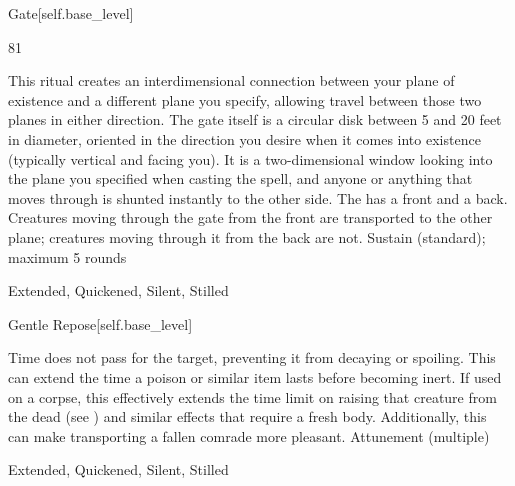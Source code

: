 \begin{spellsection}{Gate}[self.base_level]
\begin{spellcontent}
\begin{spelltargetinginfo}
\spellrng{\rngclose}
 81
\end{spelltargetinginfo}
\begin{spelleffects}
\spelleffect
This ritual creates an interdimensional connection between your plane of existence and a different plane you specify, allowing travel between those two planes in either direction.
The gate itself is a circular disk between 5 and 20 feet in diameter, oriented in the direction you desire when it comes into existence (typically vertical and facing you).
It is a two-dimensional window looking into the plane you specified when casting the spell, and anyone or anything that moves through is shunted instantly to the other side.
The  has a front and a back. Creatures moving through the gate from the front are transported to the other plane; creatures moving through it from the back are not.
\spelldur Sustain (standard); maximum 5 rounds
\end{spelleffects}
\end{spellcontent}
\begin{spellfooter}
 Extended, Quickened, Silent, Stilled
\end{spellfooter}
\begin{spellsubcontent}
\end{spellsubcontent}
\end{spellsection}
\begin{spellsection}{Gentle Repose}[self.base_level]
\begin{spellcontent}
\begin{spelltargetinginfo}
\end{spelltargetinginfo}
\begin{spelleffects}
\spelleffect
Time does not pass for the target, preventing it from decaying or spoiling.
This can extend the time a poison or similar item lasts before becoming inert.
If used on a corpse, this effectively extends the time limit on raising that creature from the dead (see ) and similar effects that require a fresh body.
Additionally, this can make transporting a fallen comrade more pleasant.
\spelldur Attunement (multiple)
\end{spelleffects}
\end{spellcontent}
\begin{spellfooter}
 Extended, Quickened, Silent, Stilled
\end{spellfooter}
\begin{spellsubcontent}
\end{spellsubcontent}
\end{spellsection}
